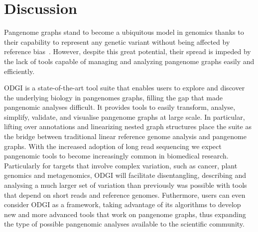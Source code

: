 \documentclass{bioinfo}
\begin{document}


%

%




\section{Discussion}
Pangenome graphs stand to become a ubiquitous model in genomics thanks to their capability to represent any genetic variant without being affected by reference bias~\citep{Eizenga_2020}.
However, despite this great potential, their spread is impeded by the lack of tools capable of managing and analyzing pangenome graphs easily and efficiently.

ODGI is a state-of-the-art tool suite that enables users to explore and discover the underlying biology in pangenomes graphs, filling the gap that made pangenomic analyses difficult.
It provides tools to easily transform, analyse, simplify, validate, and visualise pangenome graphs at large scale.
In particular, lifting over annotations and linearizing nested graph structures place the suite as the bridge between traditional linear reference genome analysis and pangenome graphs.
With the increased adoption of long read sequencing we expect pangenomic tools to become increasingly common in biomedical research.
Particularly for targets that involve complex variation, such as cancer, plant genomics and metagenomics, ODGI will facilitate disentangling,
describing and analysing a much larger set of variation than previously was possible with tools that depend on short reads and reference genomes.
Futhermore, users can even consider ODGI as a framework, taking advantage of its algorithms to develop new and more advanced tools that work on pangenome graphs,
thus expanding the type of possible pangenomic analyses available to the scientific community.
\end{document}
